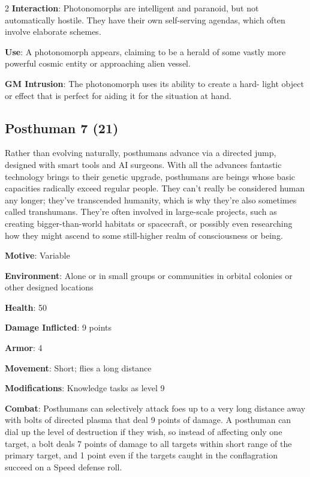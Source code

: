 \begin{multicols}{2}
\textbf{Interaction}: Photonomorphs are intelligent and paranoid, but not automatically hostile. They have their own self-serving agendas, which often involve elaborate schemes. 

\textbf{Use}: A photonomorph appears, claiming to be a herald of some vastly more powerful cosmic entity or approaching alien vessel.

\textbf{GM Intrusion}: The photonomorph uses its ability to create a hard- light object or effect that is perfect for aiding it for the situation at hand.

\subsection{Posthuman 7 (21)}

Rather than evolving naturally, posthumans advance via a directed jump, designed with smart tools and AI surgeons. With all the advances fantastic technology brings to their genetic upgrade, posthumans are beings whose basic capacities radically exceed regular people. They can’t really be considered human any longer; they’ve transcended humanity, which is why they’re also sometimes called transhumans. They’re often involved in large-scale projects, such as creating bigger-than-world habitats or spacecraft, or possibly even researching how they might ascend to some still-higher realm of consciousness or being. 

\textbf{Motive}: Variable 

\textbf{Environment}: Alone or in small groups or communities in orbital colonies or other designed locations 

\textbf{Health}: 50 

\textbf{Damage Inflicted}: 9 points 

\textbf{Armor}: 4 

\textbf{Movement}: Short; flies a long distance 

\textbf{Modifications}: Knowledge tasks as level 9 

\textbf{Combat}: Posthumans can selectively attack foes up to a very long distance away with bolts of directed plasma that deal 9 points of damage. A posthuman can dial up the level of destruction if they wish, so instead of affecting only one target, a bolt deals 7 points of damage to all targets within short range of the primary target, and 1 point even if the targets caught in the conflagration succeed on a Speed defense roll. 


\end{multicols}
